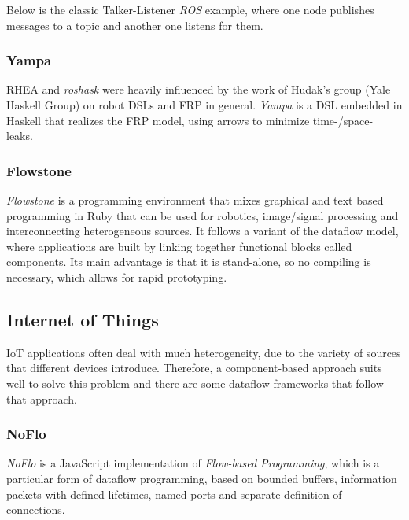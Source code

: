 \documentclass[sigplan,review,anonymous]{acmart}\settopmatter{printfolios=true,printacmref=false}
\begin{document}
Below is the classic Talker-Listener \textit{ROS} example, where one node publishes messages to a topic and another one listens for them.


\subsubsection{Yampa}

\textsc{RHEA} and \textit{roshask} were heavily influenced by the work of Hudak's group (Yale Haskell Group) on robot DSLs and FRP in general\cite{fran, arrows_robots,lambda_in_motion,event_frp,real_frp,pushpull_frp}. \textit{Yampa} is a DSL embedded in Haskell that realizes the FRP model, using arrows to minimize time-/space- leaks.

\subsubsection{Flowstone}

\textit{Flowstone}  is a programming environment that mixes graphical and text based programming in Ruby that can be used for robotics, image/signal processing and interconnecting heterogeneous sources. It follows a variant of the dataflow model, where applications are built by linking together functional blocks called components. Its main advantage is that it is stand-alone, so no compiling is necessary, which allows for rapid prototyping.

\subsection{Internet of Things}

IoT applications often deal with much heterogeneity, due to the variety of sources that different devices introduce. Therefore, a component-based approach suits well to solve this problem and there are some dataflow frameworks that follow that approach.

\subsubsection{NoFlo}

\textit{NoFlo} is a JavaScript implementation of \textit{Flow-based Programming}\cite{fbp}, which is a particular form of dataflow programming, based on bounded buffers, information packets with defined lifetimes, named ports and separate definition of connections.
\end{document}
